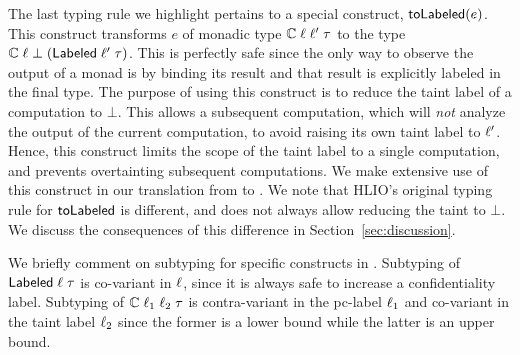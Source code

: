 The last typing rule we highlight pertains to a special construct,
$\mathsf{toLabeled}(e)$. This construct transforms $e$ of monadic type
$\mathbb{C}\;\ell\;\ell'\;\tau$ to the type
$\mathbb{C}\;\ell\;\bot\;(\mathsf{Labeled}\;\ell'\;\tau)$. This is
perfectly safe since the only way to observe the output of a monad is
by binding its result and that result is explicitly labeled in the
final type. The purpose of using this construct is to reduce the taint
label of a computation to $\bot$. This allows a subsequent
computation, which will \emph{not} analyze the output of the current
computation, to avoid raising its own taint label to
$\ell'$. Hence, this construct limits the scope of the taint label
to a single computation, and prevents overtainting subsequent
computations. We make extensive use of this construct in our
translation from {\fg} to {\cg}. We note that HLIO's original typing
rule for $\mathsf{toLabeled}$ is different, and does not always allow
reducing the taint to $\bot$. We discuss the consequences of this
difference in Section~\ref{sec:discussion}.

We briefly comment on subtyping for specific constructs in
{\cg}. Subtyping of $\mathsf{Labeled}\;\ell\;\tau$ is co-variant in
$\ell$, since it is always safe to increase a confidentiality
label. Subtyping of $\mathbb{C}\;\ell_1\;\ell_2\;\tau$ is
contra-variant in the pc-label $\ell_1$ and co-variant in the taint
label $\ell_2$ since the former is a lower bound while the latter
is an upper bound.


